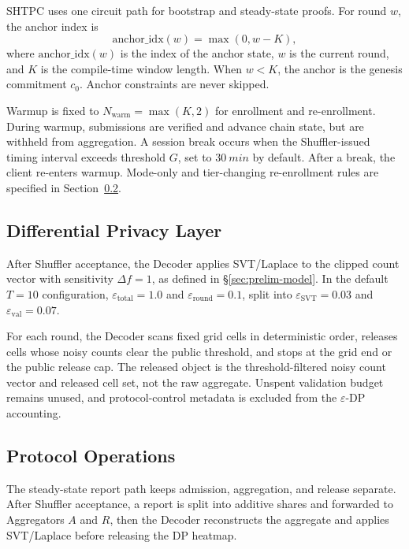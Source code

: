 \documentclass[journal]{IEEEtran}
\theoremstyle{definition}
\theoremstyle{plain}
\begin{document}
\textsc{SHTPC} uses one circuit path for bootstrap and steady-state proofs. For
round $w$, the anchor index is
\begin{equation}
  \mathrm{anchor\_idx}(w)=\max(0,w-K),
\end{equation}
\noindent where $\mathrm{anchor\_idx}(w)$ is the index of the anchor state, $w$ is the
current round, and $K$ is the compile-time window length. When $w<K$, the
anchor is the genesis commitment $c_0$. Anchor constraints are never skipped.

Warmup is fixed to
$N_{\mathrm{warm}}=\max(K,2)$
for enrollment and re-enrollment. During warmup, submissions are verified and
advance chain state, but are withheld from aggregation. A session break occurs
when the Shuffler-issued timing interval exceeds threshold $G$, set to
$\SI{30}{min}$ by default. After a break, the client re-enters warmup. Mode-only
and tier-changing re-enrollment rules are specified in
Section~\ref{sec:protocol-operations}.

\subsection{Differential Privacy Layer}
\label{sec:dp}

After Shuffler acceptance, the Decoder applies SVT/Laplace to the clipped count
vector with sensitivity $\Delta f=1$, as defined in \S\ref{sec:prelim-model}. In
the default $T=10$ configuration, $\varepsilon_{\mathrm{total}}=1.0$ and
$\varepsilon_{\mathrm{round}}=0.1$, split into
$\varepsilon_{\mathrm{SVT}}=0.03$ and $\varepsilon_{\mathrm{val}}=0.07$.

For each round, the Decoder scans fixed grid cells in deterministic order,
releases cells whose noisy counts clear the public threshold, and stops at the
grid end or the public release cap. The released object is the
threshold-filtered noisy count vector and released cell set, not the raw
aggregate. Unspent validation budget remains unused, and protocol-control
metadata is excluded from the $\varepsilon$-DP accounting.

\subsection{Protocol Operations}
\label{sec:protocol-operations}

The steady-state report path keeps admission, aggregation, and release
separate. After Shuffler acceptance, a report is split into additive shares and
forwarded to Aggregators \(A\) and \(R\), then the Decoder reconstructs the
aggregate and applies SVT/Laplace before releasing the DP heatmap.
\end{document}
